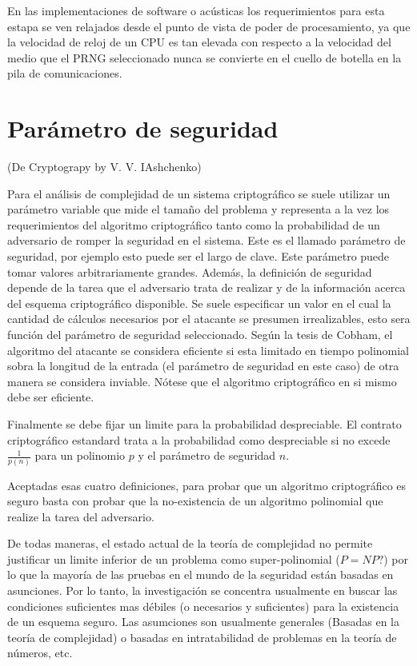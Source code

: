En las implementaciones de software o acústicas los requerimientos para esta estapa se ven relajados desde el punto de vista de poder de procesamiento, ya que la velocidad de reloj de un CPU es tan elevada con respecto a la velocidad del medio que el PRNG seleccionado nunca se convierte en el cuello de botella en la pila de comunicaciones.

\section{Parámetro de seguridad}
(De Cryptograpy by V. V. IAshchenko)\cite{primes}

Para el análisis de complejidad de un sistema criptográfico se suele utilizar un parámetro variable que mide el tamaño del problema y representa a la vez los requerimientos del algoritmo criptográfico tanto como la probabilidad de un adversario de romper la seguridad en el sistema. Este es el llamado parámetro de seguridad, por ejemplo esto puede ser el largo de clave.
Este parámetro puede tomar valores arbitrariamente grandes.
Además, la definición de seguridad depende de la tarea que el adversario trata de realizar y de la información acerca del esquema criptográfico disponible.
Se suele especificar un valor en el cual la cantidad de cálculos necesarios por el atacante se presumen irrealizables, esto sera función del parámetro de seguridad seleccionado.
Según la tesis de Cobham\cite{citeulike:6647003}, el algoritmo del atacante se considera eficiente si esta limitado en tiempo polinomial sobra la longitud de la entrada (el parámetro de seguridad en este caso) de otra manera se considera inviable. Nótese que el algoritmo criptográfico en si mismo debe ser eficiente.

Finalmente se debe fijar un limite para la probabilidad despreciable. El contrato criptográfico estandard trata a la probabilidad como despreciable si no excede $\frac{1}{p(n)}$  para un polinomio $p$ y el parámetro de seguridad $n$.

Aceptadas esas cuatro definiciones, para probar que un algoritmo criptográfico es seguro basta con probar que la no-existencia de un algoritmo polinomial que realize la tarea del adversario.

De todas maneras, el estado actual de la teoría de complejidad no permite justificar un limite inferior de un problema como super-polinomial ($P=NP?$) por lo que la mayoría de las pruebas en el mundo de la seguridad están basadas en asunciones.
Por lo tanto, la investigación se concentra usualmente en buscar las condiciones suficientes mas débiles (o necesarios y suficientes) para la existencia de un esquema seguro.
Las asumciones son usualmente generales (Basadas en la teoría de complejidad) o basadas en intratabilidad de problemas en la teoría de números, etc.

